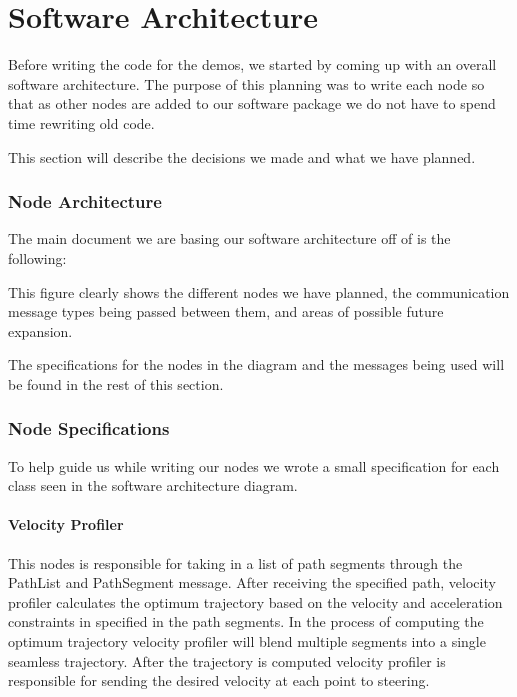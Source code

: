 \part{Software Architecture}

Before writing the code for the demos, we started by coming up with an
overall software architecture.  The purpose of this planning was to
write each node so that as other nodes are added to our software
package we do not have to spend time rewriting old code.

This section will describe the decisions we made and what we have
planned.

\section{Node Architecture}

The main document we are basing our software architecture off of is
the following:

\FloatBarrier
{}
\FloatBarrier


This figure clearly shows the different nodes we have planned, the
communication message types being passed between them, and areas of
possible future expansion.

The specifications for the nodes in the diagram and the messages being
used will be found in the rest of this section.



\section{Node Specifications}

To help guide us while writing our nodes we wrote a small
specification for each class seen in the software architecture diagram.

\subsection{Velocity Profiler}
This nodes is responsible for taking in a list of path segments through the PathList and PathSegment message. After receiving the specified path, velocity profiler calculates the optimum trajectory based on the velocity and acceleration constraints in specified in the path segments. In the process of computing the optimum trajectory velocity profiler will blend multiple segments into a single seamless trajectory. After the trajectory is computed velocity profiler is responsible for sending the desired velocity at each point to steering.

